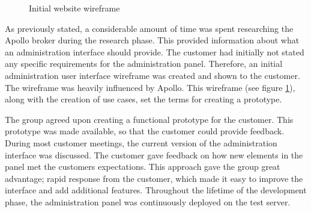 \begin{center}
  \begin{figure}[ht!]
    \caption{Initial website wireframe}
    \label{fig:initial_prototype}
  \end{figure}
\end{center}

As previously stated, a considerable amount of time was spent researching the Apollo broker during the research phase. This provided information about what an administration interface should provide. The customer had initially not stated any specific requirements for the administration panel. Therefore, an initial administration user interface wireframe was created and shown to the customer. The wireframe was heavily influenced by Apollo. This wireframe (see figure \ref{fig:initial_prototype}), along with the creation of use cases, set the terms for creating a prototype.

The group agreed upon creating a functional prototype for the customer. This prototype was made available, so that the customer could provide feedback. During most customer meetings, the current version of the administration interface was discussed. The customer gave feedback on how new elements in the panel met the customers expectations. This approach gave the group great advantage; rapid response from the customer, which made it easy to improve the interface and add additional features. Throughout the lifetime of the development phase, the administration panel was continuously deployed on the test server.

